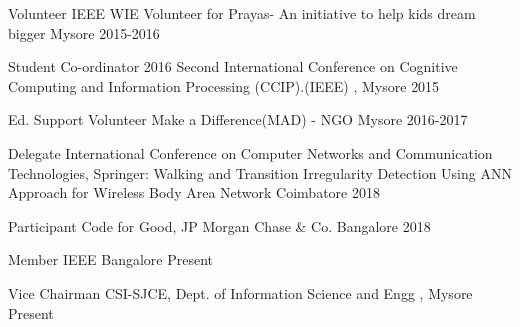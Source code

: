 

\begin{cvhonors}

  \cvhonor
    {Volunteer} %
    {IEEE WIE Volunteer for Prayas- An initiative to help kids dream bigger} %
    {Mysore} %
    {2015-2016} %


   \cvhonor
    {Student Co-ordinator} %
    {2016 Second International Conference on Cognitive Computing and
Information Processing (CCIP).(IEEE) ,} %
    {Mysore} %
    {2015} %


   \cvhonor
    {Ed. Support Volunteer} %
    {Make a Difference(MAD) - NGO} %
    {Mysore} %
    {2016-2017} %


  \cvhonor
    {Delegate} %
    {International Conference on Computer Networks and Communication Technologies, Springer: Walking and Transition Irregularity Detection Using ANN Approach for Wireless Body Area Network  } %
    {Coimbatore} %
    {2018} %


  \cvhonor
    {Participant} %
    {Code for Good, JP Morgan Chase \& Co.} %
    {Bangalore} %
    {2018} %


   \cvhonor
    {Member} %
    {IEEE} %
    {Bangalore} %
    {Present} %


   \cvhonor
    {Vice Chairman} %
    {CSI-SJCE, Dept. of Information Science and Engg ,} %
    {Mysore} %
    {Present} %

\end{cvhonors}
